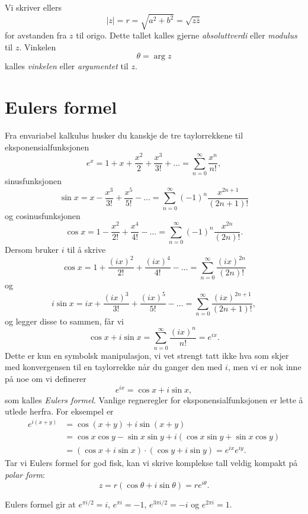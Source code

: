  Vi skriver ellers
 \[|z|=r=\sqrt{a^2+b^2}=\sqrt{z\overline z}\]
 for avstanden fra $z$ til origo. 
 Dette tallet kalles gjerne \emph{absoluttverdi} eller \emph{modulus} til $z$. 
 Vinkelen 
 \[
 \theta= \arg z
 \] 
 kalles \emph{vinkelen} eller \emph{argumentet} til $z$.


\section*{Eulers formel}
Fra envariabel kalkulus husker du kanskje de tre taylorrekkene til eksponensialfunksjonen
\[
e^{x}=1+x+\frac{x^{2}}{2}+\frac{x^{3}}{3!}+\dots=\sum_{n=0}^{\infty}\frac{x^{n}}{n!}, 
\]
sinusfunksjonen
\[
\sin{x}=x-\frac{x^{3}}{3!}+\frac{x^{5}}{5!}-\dots=\sum_{n=0}^{\infty}(-1)^{n}\frac{x^{2n+1}}{(2n+1)!} 
\]
og cosinusfunksjonen
\[
\cos{x}=1-\frac{x^{2}}{2!}+\frac{x^{4}}{4!}-\dots=\sum_{n=0}^{\infty}(-1)^{n}\frac{x^{2n}}{(2n)!}.
\]
Dersom bruker $i$ til å skrive
\[
\cos{x}=1+\frac{(ix)^{2}}{2!}+\frac{(ix)^{4}}{4!}-\dots=\sum_{n=0}^{\infty}\frac{(ix)^{2n}}{(2n)!}
\]
og 
\[
i\sin{x}=ix+\frac{(ix)^{3}}{3!}+\frac{(ix)^{5}}{5!}-\dots=\sum_{n=0}^{\infty}\frac{(ix)^{2n+1}}{(2n+1)!},
\]
og legger disse to sammen, får vi 
\[
\cos x + i\sin x=\sum_{n=0}^{\infty}\frac{(ix)^{n}}{n!}=e^{ix}.
\]
Dette er kun en symbolsk manipulasjon, 
vi vet strengt tatt ikke hva som skjer med konvergensen til en taylorrekke når du ganger den med $i$, 
men vi er nok inne på noe om vi definerer
\[
e^{ix}=\cos x + i\sin x,
\]
som kalles \emph{Eulers formel}. 
Vanlige regneregler for eksponensialfunksjonen er lette å utlede herfra. For eksempel er 
\begin{align*}
e^{i(x+y)}  &= \cos (x+y) + i\sin (x+y) \\[5pt] &= \cos x \cos y - \sin x \sin y + i (\cos x \sin y + \sin x \cos y) \\[5pt] &= 
(\cos x+ i \sin x) \cdot (\cos y+ i \sin y) = e^{ix}e^{iy}.
\end{align*}
Tar vi Eulers formel for god fisk, kan vi skrive komplekse tall veldig kompakt på \emph{polar form}:
\[
z=r(\cos \theta+i\sin \theta)=re^{i\theta}.
\]

\begin{ex}
Eulers formel gir at $e^{ \pi i/2 }=i$, $e^{\pi i}=-1$, $e^{3\pi i/2 }=-i$ og $e^{2 \pi i}=1$.
\end{ex}

